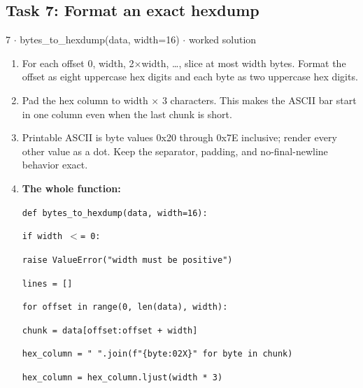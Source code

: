 \documentclass[11pt]{article}
\begin{document}
\begin{keepsection}\subsection{Task 7: Format an exact hexdump}

\begin{workedbox}{7 \ensuremath{\cdot} bytes\_to\_hexdump(data, width=16) \ensuremath{\cdot} worked solution}
\begin{enumerate}
\item For each offset 0, width, 2\ensuremath{\times}width, …, slice at most width bytes. Format the offset as eight uppercase hex digits and each byte as two uppercase hex digits.
\item Pad the hex column to width \ensuremath{\times} 3 characters. This makes the ASCII bar start in one column even when the last chunk is short.
\item Printable ASCII is byte values 0x20 through 0x7E inclusive; render every other value as a dot. Keep the separator, padding, and no-final-newline behavior exact.
\item {}
\textbf{The whole function:}
\begin{tcolorbox}[colback=Paperblue,colframe=Paperblue,boxrule=0pt,arc=0pt,left=7pt,right=7pt,top=5pt,bottom=5pt]\small\sloppy
\noindent\hspace*{0em}\texttt{def bytes\_to\_hexdump(data, width=16):}\par
\noindent\hspace*{1em}\texttt{if width \ensuremath{<}= 0:}\par
\noindent\hspace*{3em}\texttt{raise ValueError("width must be positive")}\par
\noindent\hspace*{1em}\texttt{lines = []}\par
\noindent\hspace*{1em}\texttt{for offset in range(0, len(data), width):}\par
\noindent\hspace*{3em}\texttt{chunk = data[offset:offset + width]}\par
\noindent\hspace*{3em}\texttt{hex\_column = " ".join(f"\{byte:02X\}" for byte in chunk)}\par
\noindent\hspace*{3em}\texttt{hex\_column = hex\_column.ljust(width * 3)}\par

\end{tcolorbox}
\end{enumerate}
\end{workedbox}
\end{keepsection}
\end{document}
